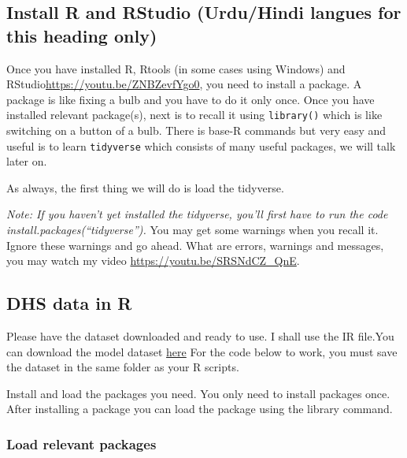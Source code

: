 \documentclass[
  letterpaper,
  DIV=11,
  numbers=noendperiod]{scrartcl}
\begin{document}
\hypertarget{install-r-and-rstudio-urduhindi-langues-for-this-heading-only}{%
\subsection{Install R and RStudio (Urdu/Hindi langues for this heading
only)}\label{install-r-and-rstudio-urduhindi-langues-for-this-heading-only}}

Once you have installed R, Rtools (in some cases using Windows) and
RStudio\url{https://youtu.be/ZNBZevfYgo0}, you need to install a
package. A package is like fixing a bulb and you have to do it only
once. Once you have installed relevant package(s), next is to recall it
using \texttt{library()} which is like switching on a button of a bulb.
There is base-R commands but very easy and useful is to learn
\texttt{tidyverse} which consists of many useful packages, we will talk
later on.

As always, the first thing we will do is load the tidyverse.

\emph{Note: If you haven't yet installed the tidyverse, you'll first
have to run the code install.packages(``tidyverse'').} You may get some
warnings when you recall it. Ignore these warnings and go ahead. What
are errors, warnings and messages, you may watch my video
\url{https://youtu.be/SRSNdCZ_QnE}.

\hypertarget{dhs-data-in-r}{%
\subsection{DHS data in R}\label{dhs-data-in-r}}

Please have the dataset downloaded and ready to use. I shall use the IR
file.You can download the model dataset
\href{https://www.dhsprogram.com/data/Model-Datasets.cfm}{here} For the
code below to work, you must save the dataset in the same folder as your
R scripts.

Install and load the packages you need. You only need to install
packages once. After installing a package you can load the package using
the library command.

\hypertarget{load-relevant-packages}{%
\subsubsection{Load relevant packages}\label{load-relevant-packages}}
\end{document}

